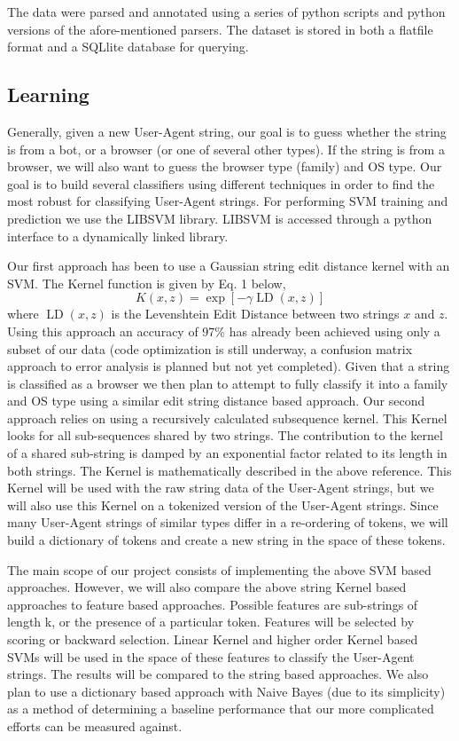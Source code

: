 \documentclass[10pt]{article}
\begin{document}
The data were parsed and annotated using a series of python scripts and python versions of the afore-mentioned parsers.  The dataset is stored in both a flatfile format and a SQLlite database for querying.  

\subsection{Learning}
Generally, given a new User-Agent string, our goal is to guess whether the string is from a bot, or a browser (or one of several other types).  If the string is from a browser, we will also want to guess the browser type (family) and OS type.    Our goal is to build several classifiers using different techniques in order to find the most robust for classifying User-Agent strings.  For performing SVM training and prediction we use the LIBSVM library.\cite{libsvm}  LIBSVM is accessed through a python interface to a dynamically linked library. 

Our first approach has been to use a Gaussian string edit distance kernel with an SVM.   The Kernel function is given by Eq. 1 below,
\begin{equation}
K(x,z) = \exp \left[ - \gamma \operatorname{LD} (x,z) \right]
\end{equation}
where $\operatorname{LD}(x,z)$ is the Levenshtein Edit Distance between two strings $x$ and $z$.  Using this approach an accuracy of 97\% has already been achieved using only a subset of our data (code optimization is still underway, a confusion matrix approach to error analysis is planned but not yet completed).   Given that a string is classified as a browser we then plan to attempt to fully classify it into a family and OS type using a similar edit string distance based approach.
Our second approach relies on using a recursively calculated subsequence kernel.\cite{subseqkernel}  This Kernel looks for all sub-sequences shared by two strings.  The contribution to the kernel of a shared sub-string is damped by an exponential factor related to its length in both strings.  The Kernel is mathematically described  in the above reference.  This Kernel will be used with the raw string data of the User-Agent strings, but we will also use this Kernel on a tokenized version of the User-Agent strings.  Since many User-Agent strings of similar types differ in a re-ordering of tokens, we will build a dictionary of tokens and create a new string in the space of these tokens.  

The main scope of our project consists of implementing the above SVM based approaches.  However, we will also compare the above string Kernel based approaches to feature based approaches.  Possible features are sub-strings of length k, or the presence of a particular token.  Features will be selected by scoring or backward selection.  Linear Kernel and higher order Kernel based SVMs will be used in the space of these features to classify the User-Agent strings.  The results will be compared to the string based approaches.  We also plan to use a dictionary based approach with Naive Bayes (due to its simplicity) as a method of determining a baseline performance that our more complicated efforts can be measured against.  





\end{document}
